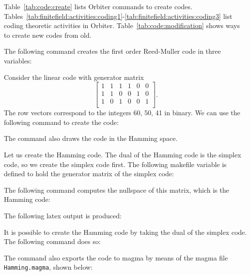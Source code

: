 Table~\ref{tab:code:create} lists Orbiter commands to create codes. 
Tables~\ref{tab:finitefield:activities:coding1}-\ref{tab:finitefield:activities:coding3} 
list coding theoretic activities in Orbiter. 
Table~\ref{tab:code:modification} shows ways to create new codes from old.

\bigskip




The following command creates the first order Reed-Muller code in three variables:




\bigskip

Consider the linear code with generator matrix
$$
\left[
\begin{array}{cccccc}
1&1&1&1&0&0 \\
1&1&0&0&1&0 \\
1&0&1&0&0&1 \\
\end{array}
\right].
$$
The row vectors correspond to the integers 60, 50, 41 in binary. 
We can use the following command to create the code:


The command also draws the code in the Hamming space.


\bigskip


Let us create the Hamming code.
The dual of the Hamming code is the simplex code, 
so we create the simplex code first.
The following makefile variable is defined to hold the generator matrix of the simplex code:


The following command computes the nullspace of this matrix, 
which is the Hamming code:


The following latex output is produced:

\bigskip

It is possible to create the Hamming code by taking the dual of the simplex code. 
The following command does so:


The command also exports the code to magma 
by means of the magma file \verb'Hamming.magma', shown below:


